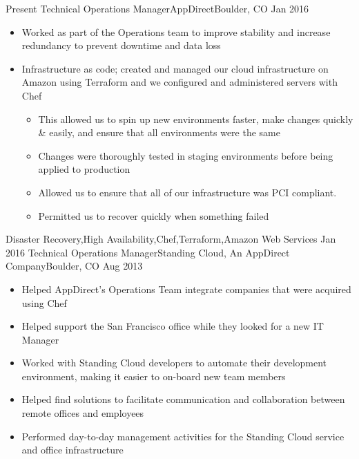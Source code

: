\begin{experiences}
  \experience
    {Present}       {Technical Operations Manager}{AppDirect}{Boulder, CO}
    {Jan 2016} {
                      \begin{itemize}
                        \item Worked as part of the Operations team to improve stability and increase redundancy to prevent downtime and data loss
                        \item Infrastructure as code; created and managed our cloud infrastructure on Amazon using Terraform and we configured and administered servers with Chef
                        \begin{itemize}
                          \item This allowed us to spin up new environments faster, make changes quickly \& easily, and ensure that all environments were the same
                          \item Changes were thoroughly tested in staging environments before being applied to production
                          \item Allowed us to ensure that all of our infrastructure was PCI compliant.
                          \item Permitted us to recover quickly when something failed
                        \end{itemize}
                      \end{itemize}
                    }
                    {Disaster Recovery,High Availability,Chef,Terraform,Amazon Web Services}
  \emptySeparator
  \experience
    {Jan 2016}      {Technical Operations Manager}{Standing Cloud, An AppDirect Company}{Boulder, CO}
    {Aug 2013}      {
                      \begin{itemize}
                        \item Helped AppDirect's Operations Team integrate companies that were acquired using Chef
                        \item Helped support the San Francisco office while they looked for a new IT Manager
                        \item Worked with Standing Cloud developers to automate their development environment, making it easier to on-board new team members
                        \item Helped find solutions to facilitate communication and collaboration between remote offices and employees
                        \item Performed day-to-day management activities for the Standing Cloud service and office infrastructure

\end{itemize}}
\end{experiences}

